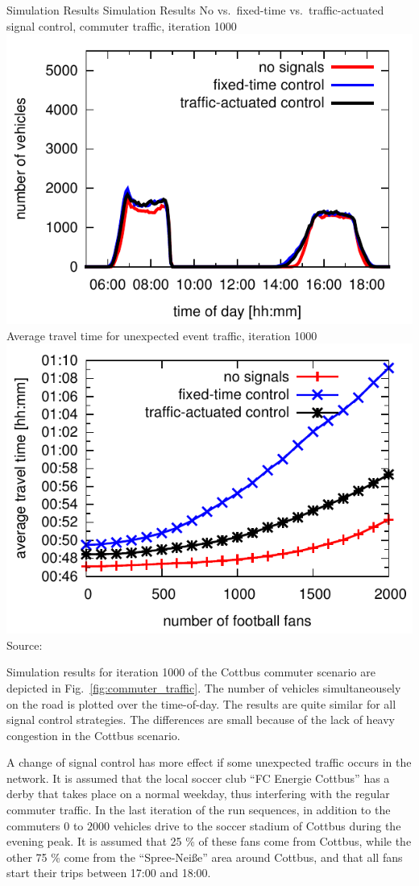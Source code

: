 \createfigure%
{Simulation Results}%
{Simulation Results}%
{\label{fig:results_histogram}}
{%
  \createsubfigure%
  {No vs.~fixed-time vs.~traffic-actuated signal control, commuter traffic, iteration 1000}%
	{\includegraphics[width=0.48\linewidth]{extending/figures/signalslanes/leg_histogram_1292_1293_1291_it_1000.pdf}}
  {\label{fig:commuter_traffic}}%
  \createsubfigure%
	{Average travel time for unexpected event traffic, iteration 1000}
	{\includegraphics[width=0.48\linewidth]{extending/figures/signalslanes/average_travel_time_1220_1222.pdf}}
	{\label{fig:unexpected_event}}
}%
{Source:~\citet{Grether2014PhD}}

Simulation results for iteration 1000 of the Cottbus commuter scenario are depicted in
Fig.~\ref{fig:commuter_traffic}. 
The number of vehicles simultaneousely on the road is plotted over the time-of-day. 
The results are quite similar for all signal control strategies. 
The differences are small because of the lack of heavy congestion in the Cottbus scenario. 

A change of signal control has more effect if some unexpected traffic occurs in the network. 
It is assumed that the local soccer club ``FC Energie Cottbus'' has a derby that takes place on a normal weekday, thus interfering with the regular commuter traffic. 
In the last iteration of the run sequences, in addition to the commuters $0$ to $2000$ vehicles drive to the soccer stadium of Cottbus during the evening peak. 
It is assumed that 25 \% of these fans come from Cottbus,
while the other 75 \% come from the ``Spree-Nei{\ss}e'' area around Cottbus, and that all fans start their trips between 17:00 and 18:00. 

